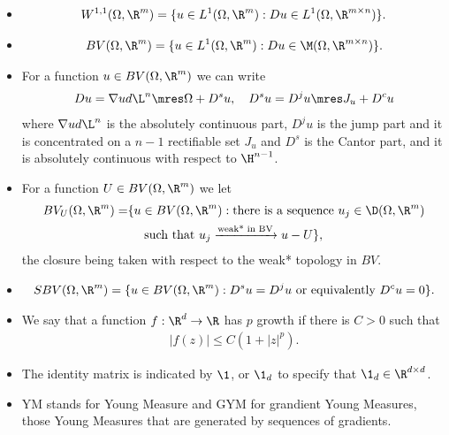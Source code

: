 \begin{itemize}
\item \begin{align}
W^{1,1}(\Omega,\R^m) = \{ u\in L^1(\Omega,\R^m) : Du\in L^1(\Omega,\R^{m\times n}) \}.
\end{align}
\item \begin{align}
BV(\Omega,\R^m) = \{ u\in L^1(\Omega,\R^m) : Du\in \M(\Omega,\R^{m\times n}) \}.
\end{align}
\item For a function $u\in BV(\Omega,\R^m)$ we can write
\begin{align}
Du = \nabla u d\L^n\mres \Omega + D^s u, \quad D^s u = D^j u\mres J_u + D^c u
\end{align}
where $\nabla u d\L^n$ is the absolutely continuous part, $D^j u$ is the jump part and it is concentrated on a $n-1$ rectifiable set $J_u$ and $D^s$ is the Cantor part, and it is absolutely continuous with respect to $\H^{n-1}$.
\item For a function $U\in BV(\Omega,\R^m)$ we let
\begin{align}
BV_U(\Omega,\R^m) = & \{ u\in BV(\Omega,\R^m): \text{there is a sequence } u_j\in \D(\Omega,\R^m) \\
& \quad \text{ such that } u_j \xrightarrow{\text{weak* in BV}} u-U  \},
\end{align}
the closure being taken with respect to the weak* topology in $BV$.
\item \begin{align}
SBV(\Omega,\R^m) = \{ u\in BV(\Omega,\R^m): D^s u = D^j u \text{ or equivalently } D^c u=0\}.
\end{align}
\item We say that a function $f:\R^d\to \R$ has $p$ growth if there is $C>0$ such that
\begin{align}
|f(z)| \leq C(1+|z|^p).
\end{align}
\item The identity matrix is indicated by $\1$, or $\1_d$ to specify that $\1_d\in \R^{d\times d}$.
\item YM stands for Young Measure and GYM for grandient Young Measures, those Young Measures that are generated by sequences of gradients.
\end{itemize}

\newpage

